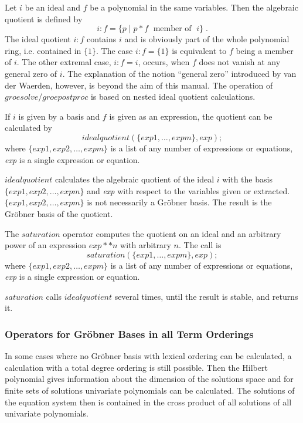  
Let $i$ be an ideal and $f$ be a polynomial in the same
variables. Then the algebraic quotient is defined by
\[
i:f = \{ p \;| \; p * f \;\mbox{    member of }\; i\}\;.
\]
The ideal quotient $i:f$ contains $i$ and is obviously part of the
whole polynomial ring, i.e. contained in $\{1\}$. The case $i:f =
\{1\}$ is equivalent to $f$ being a member of  $i$. The other extremal
case, $i:f=i$, occurs, when $f$ does not vanish at any general zero of $i$.
The explanation of the notion ``general zero'' introduced by van der
Waerden, however, is beyond the aim of this manual. The operation
of $groesolve$/$groepostproc$ is based on nested ideal quotient
calculations.

If $i$ is given by a basis and $f$ is given as an expression, the
quotient can be calculated by
\[
idealquotient (\{exp1, \ldots , expm\}, exp); \]
where $\{exp1, exp2, \ldots , expm\}$ is a list of any number of
expressions or equations, {\it exp} is a single expression or equation.

$idealquotient$ calculates the algebraic quotient of the ideal $i$
with the basis  $\{exp1, exp2, \ldots , expm\}$ and {\it exp} with
respect to  the variables given or extracted.  $\{exp1, exp2, \ldots ,
expm\}$ is not necessarily a Gr\"obner basis.
The result is the Gr\"obner basis of the quotient.

The $saturation$ operator computes the quotient on an ideal and an arbitrary power
of an expression $exp**n$ with arbitrary $n$. The call is
\[ saturation (\{exp1, \ldots , expm\}, exp); \]
where $\{exp1, exp2, \ldots , expm\}$ is a list of any number of
expressions or equations, {\it exp} is a single expression or equation.

$saturation$ calls $idealquotient$ several times, until the result is
stable, and returns it.

\subsubsection{Operators for Gr\"obner Bases in all Term Orderings}
In some cases where no Gr\"obner
basis with lexical ordering can be calculated, a calculation with a total
degree ordering is still possible. Then the Hilbert polynomial gives
information about the dimension of the solutions space and for finite
sets of solutions univariate polynomials can be calculated. The solutions
of the equation system then is contained in the cross product of all
solutions of all univariate polynomials.

